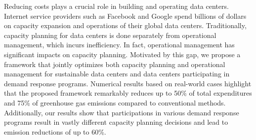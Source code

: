 
Reducing costs plays a crucial role in building and operating data centers. Internet service providers such as Facebook and Google spend billions of dollars on capacity expansion and operations of their global data centers. Traditionally, capacity planning for data centers is done separately from operational management, which incurs inefficiency. In fact, operational management has significant impacts on capacity planning. Motivated by this gap, we propose a framework that jointly optimizes both capacity planning and operational management for sustainable data centers and data centers participating in demand response programs. Numerical results based on real-world cases highlight that the proposed framework remarkably reduces up to 50\% of total expenditures and 75\% of greenhouse gas emissions compared to conventional methods. Additionally, our results show that participations in various demand response programs result in vastly different capacity planning decisions and lead to emission reductions of up to 60\%.
